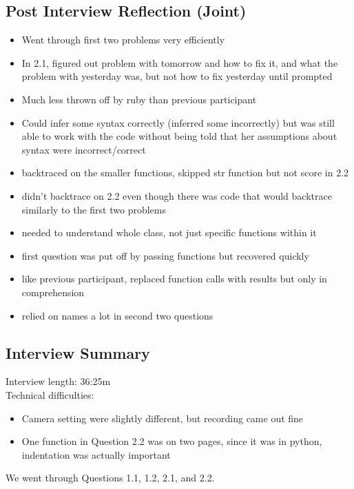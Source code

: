 \documentclass{article}
\begin{document}
\subsection{Post Interview Reflection (Joint)}
\begin{itemize}
  \item Went through first two problems very efficiently
  \item In 2.1, figured out problem with tomorrow and how to fix it, and what the problem with yesterday was, but not how to fix yesterday until prompted
  \item Much less thrown off by ruby than previous participant
  \item Could infer some syntax correctly (inferred some incorrectly) but was still able to work with the code without being told that her assumptions about syntax were incorrect/correct
  \item backtraced on the smaller functions, skipped str function but not score in 2.2
  \item didn't backtrace on 2.2 even though there was code that would backtrace similarly to the first two problems
  \item needed to understand whole class, not just specific functions within it
  \item first question was put off by passing functions but recovered quickly
  \item like previous participant, replaced function calls with results but only in comprehension
  \item relied on names a lot in second two questions
\end{itemize}
\subsection{Interview Summary}
Interview length: 36:25m \\
Technical difficulties:
\begin{itemize}
  \item Camera setting were slightly different, but recording came out fine
  \item One function in Question 2.2 was on two pages, since it was in python, indentation was actually important
\end{itemize}
We went through Questions 1.1, 1.2, 2.1, and 2.2.
\end{document}
